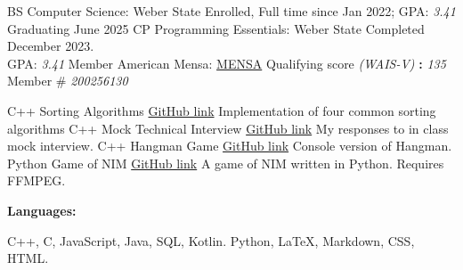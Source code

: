 \documentclass[9pt]{developercv}
\begin{document}
\begin{minipage}[t]{0.49\textwidth}
 \vspace{-\baselineskip}
 \begin{entrylist}
        \entry
    		{BS}
            {Computer Science:}
            {Weber State}
            { Enrolled, Full time since Jan 2022; \hspace{.13\textwidth}GPA: \textit{3.41} \\Graduating June 2025}
        \entry
            {CP}
    		{Programming Essentials:}
    		{Weber State}
            {Completed December 2023. \\GPA:\hspace{.692\textwidth} \textit{3.41}}
        \entry
    		{Member}
    		{American Mensa:}
    		{\href{https://www.us.mensa.org/}{MENSA}}
            {Qualifying score \textit{(WAIS-V)} \textbf{:} \hspace{.342\textwidth}\textit{135}\\ Member \#
            \hspace{.469\textwidth}\textit{200256130}}
    \end{entrylist}
    \vspace{-15pt}
    \begin{entrylist}
        \entry
    		{C++}
            {Sorting Algorithms}
            {\href{https://github.com/IMGradeE/Other_Uni_Projects/tree/CanonSortingAlgorithm}{GitHub link}}
            {Implementation of four common sorting algorithms}
            \entry
            {C++}
    		{Mock Technical Interview}
    		{\href{https://github.com/IMGradeE/MockInterview_Fall-2023https://github.com/IMGradeE/MockInterview_Fall-2023}{GitHub link}}
            {My responses to in class mock interview.}
        \entry
    		{C++}
    		{Hangman Game}
    		{\href{https://github.com/IMGradeE/Hangman_Fall-2022}{GitHub link}}
            {Console version of Hangman.}
        \entry
    		{Python}
    		{Game of NIM}
    		{\href{https://github.com/IMGradeE/GameOfNim_Spring-2022}{GitHub link}}
            {A game of NIM written in Python. Requires FFMPEG.}
    \end{entrylist}
    \vspace{-5pt}
\begin{minipage}[t]{.02\textwidth}
    \end{minipage}
    \hfill
     \begin{minipage}[t]{.98\textwidth}
    \begin{minipage}[t]{0.2\textwidth}
        \textbf{Languages:}
    \end{minipage}
    \hfill
    \begin{minipage}[t]{0.73\textwidth}
      C++, C, JavaScript, Java, SQL, Kotlin. Python, LaTeX, Markdown, CSS, HTML.
    \end{minipage}


\end{minipage}
\end{minipage}
\end{document}
